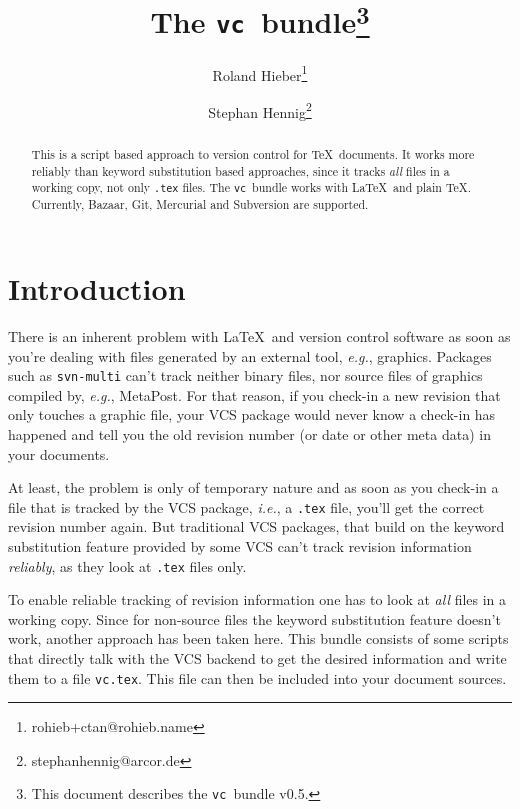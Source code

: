 \documentclass[11pt]{article}
\newcommand*{\pkg}{\texttt{vc}}
\begin{document}
\author{Roland Hieber\thanks{rohieb+ctan@rohieb.name} \and
    Stephan Hennig\thanks{stephanhennig@arcor.de}}
\title{The \pkg\ bundle\thanks{This document describes the \pkg\ bundle
    v0.5.}}
\maketitle
\begin{abstract}
  This is a script based approach to version control for \TeX\
  documents.  It works more reliably than keyword substitution based
  approaches, since it tracks \emph{all} files in a working copy, not
  only \texttt{.tex} files.  The \pkg\ bundle works with \LaTeX\ and
  plain \TeX.  Currently, Bazaar, Git, Mercurial and Subversion are supported.
\end{abstract}
\begin{multicols}{2}
\tableofcontents
\end{multicols}



\section{Introduction}
There is an inherent problem with \LaTeX\ and version control software
as soon as you're dealing with files generated by an external tool,
\emph{e.g.}, graphics.  Packages such as \texttt{svn-multi} can't track
neither binary files, nor source files of graphics compiled by,
\emph{e.g.}, MetaPost.  For that reason, if you check-in a new revision
that only touches a graphic file, your VCS package would never know a
check-in has happened and tell you the old revision number (or date or
other meta data) in your documents.

At least, the problem is only of temporary nature and as soon as you
check-in a file that is tracked by the VCS package, \emph{i.e.}, a
\texttt{.tex} file, you'll get the correct revision number again.  But
traditional VCS packages, that build on the keyword substitution feature
provided by some VCS can't track revision information \emph{reliably},
as they look at \texttt{.tex} files only.

To enable reliable tracking of revision information one has to look at
\emph{all} files in a working copy.  Since for non-source files the
keyword substitution feature doesn't work, another approach has been
taken here.  This bundle consists of some scripts that directly talk
with the VCS backend to get the desired information and write them to a
file \texttt{vc.tex}.  This file can then be included into your document
sources.
\end{document}
